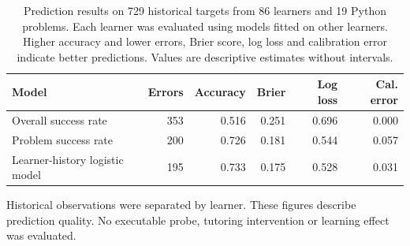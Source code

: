 \begin{table}[tb]
\centering
\caption{Prediction results on 729 historical targets from 86 learners and 19 Python problems.
Each learner was evaluated using models fitted on other learners. Higher accuracy and lower errors,
Brier score, log loss and calibration error indicate better predictions.
Values are descriptive estimates without intervals.}
\label{tab:csedm-model-comparison}
\medskip
\begin{tabular}{lrrrrr}
\toprule
Model & Errors & Accuracy & Brier & Log loss & Cal. error \\
\midrule
Overall success rate & 353 & 0.516 & 0.251 & 0.696 & 0.000 \\
Problem success rate & 200 & 0.726 & 0.181 & 0.544 & 0.057 \\
Learner-history logistic model & 195 & 0.733 & 0.175 & 0.528 & 0.031 \\
\bottomrule
\end{tabular}
\begin{minipage}{0.96\linewidth}
\footnotesize Historical observations were separated by learner. These figures describe
prediction quality. No executable probe, tutoring intervention or learning effect was evaluated.
\end{minipage}
\end{table}
